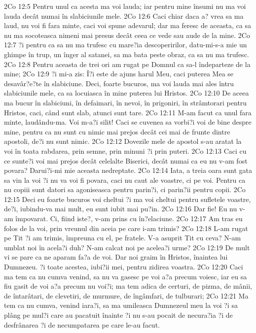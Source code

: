 2Co 12:5  Pentru unul ca acesta ma voi lauda; iar pentru mine însumi nu ma voi lauda decât numai în slabiciunile mele.
2Co 12:6  Caci chiar daca a? vrea sa ma laud, nu voi fi fara minte, caci voi spune adevarul; dar ma feresc de aceasta, ca sa nu ma socoteasca nimeni mai presus decât ceea ce vede sau aude de la mine.
2Co 12:7  ?i pentru ca sa nu ma trufesc cu mare?ia descoperirilor, datu-mi-s-a mie un ghimpe în trup, un înger al satanei, sa ma bata peste obraz, ca sa nu ma trufesc.
2Co 12:8  Pentru aceasta de trei ori am rugat pe Domnul ca sa-l îndeparteze de la mine;
2Co 12:9  ?i mi-a zis: Î?i este de ajuns harul Meu, caci puterea Mea se desavâr?e?te în slabiciune. Deci, foarte bucuros, ma voi lauda mai ales întru slabiciunile mele, ca sa locuiasca în mine puterea lui Hristos.
2Co 12:10  De aceea ma bucur în slabiciuni, în defaimari, în nevoi, în prigoniri, în strâmtorari pentru Hristos, caci, când sunt slab, atunci sunt tare.
2Co 12:11  M-am facut ca unul fara minte, laudându-ma. Voi m-a?i silit! Caci se cuvenea sa vorbi?i voi de bine despre mine, pentru ca nu sunt cu nimic mai prejos decât cei mai de frunte dintre apostoli, de?i nu sunt nimic.
2Co 12:12  Dovezile mele de apostol s-au aratat la voi în toata rabdarea, prin semne, prin minuni ?i prin puteri.
2Co 12:13  Caci cu ce sunte?i voi mai prejos decât celelalte Biserici, decât numai ca eu nu v-am fost povara? Darui?i-mi mie aceasta nedreptate.
2Co 12:14  Iata, a treia oara sunt gata sa vin la voi ?i nu va voi fi povara, caci nu caut ale voastre, ci pe voi. Pentru ca nu copiii sunt datori sa agoniseasca pentru parin?i, ci parin?ii pentru copii.
2Co 12:15  Deci eu foarte bucuros voi cheltui ?i ma voi cheltui pentru sufletele voastre, de?i, iubindu-va mai mult, eu sunt iubit mai pu?in.
2Co 12:16  Dar fie! Eu nu v-am împovarat. Ci, fiind iste?, v-am prins cu în?elaciune.
2Co 12:17  Am tras eu folos de la voi, prin vreunul din aceia pe care i-am trimis?
2Co 12:18  L-am rugat pe Tit ?i am trimis, împreuna cu el, pe fratele. V-a asuprit Tit cu ceva? N-am umblat noi în acela?i duh? N-am calcat noi pe acelea?i urme?
2Co 12:19  De mult vi se pare ca ne aparam fa?a de voi. Dar noi graim în Hristos, înaintea lui Dumnezeu. ?i toate acestea, iubi?ii mei, pentru zidirea voastra.
2Co 12:20  Caci ma tem ca nu cumva venind, sa nu va gasesc pe voi a?a precum voiesc, iar eu sa fiu gasit de voi a?a precum nu voi?i; ma tem adica de certuri, de pizma, de mânii, de întarâtari, de clevetiri, de murmure, de îngâmfari, de tulburari;
2Co 12:21  Ma tem ca nu cumva, venind iara?i, sa ma umileasca Dumnezeul meu la voi ?i sa plâng pe mul?i care au pacatuit înainte ?i nu s-au pocait de necura?ia ?i de desfrânarea ?i de necumpatarea pe care le-au facut.
